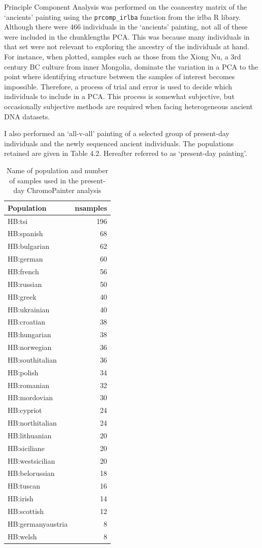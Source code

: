 Principle Component Analysis was performed on the coancestry matrix of the `ancients' painting using the \texttt{prcomp\_irlba} function from the irlba R libary. Although there were 466 individuals in the `ancients' painting, not all of these were included in the chunklengths PCA. This was because many individuals in that set were not relevant to exploring the ancestry of the individuals at hand. For instance, when plotted, samples such as those from the Xiong Nu, a 3rd century BC culture from inner Mongolia, dominate the variation in a PCA to the point where identifying structure between the samples of interest becomes impossible. Therefore, a process of trial and error is used to decide which individuals to include in a PCA. This process is somewhat subjective, but occasionally subjective methods are required when facing heterogeneous ancient DNA datasets. 

I also performed an `all-v-all' painting of a selected group of present-day individuals and the newly sequenced ancient individuals. The populations retained are given in Table 4.2. Hereafter referred to as `present-day painting'.

\begin{table}
\small
\begin{tabular}{l|r}
\hline
Population & nsamples\\
\hline
HB:tsi & 196\\
\hline
HB:spanish & 68\\
\hline
HB:bulgarian & 62\\
\hline
HB:german & 60\\
\hline
HB:french & 56\\
\hline
HB:russian & 50\\
\hline
HB:greek & 40\\
\hline
HB:ukrainian & 40\\
\hline
HB:croatian & 38\\
\hline
HB:hungarian & 38\\
\hline
HB:norwegian & 36\\
\hline
HB:southitalian & 36\\
\hline
HB:polish & 34\\
\hline
HB:romanian & 32\\
\hline
HB:mordovian & 30\\
\hline
HB:cypriot & 24\\
\hline
HB:northitalian & 24\\
\hline
HB:lithuanian & 20\\
\hline
HB:siciliane & 20\\
\hline
HB:westsicilian & 20\\
\hline
HB:belorussian & 18\\
\hline
HB:tuscan & 16\\
\hline
HB:irish & 14\\
\hline
HB:scottish & 12\\
\hline
HB:germanyaustria & 8\\
\hline
HB:welsh & 8\\
\hline
\end{tabular}
\caption{Name of population and number of samples used in the present-day ChromoPainter analysis}
\end{table}

